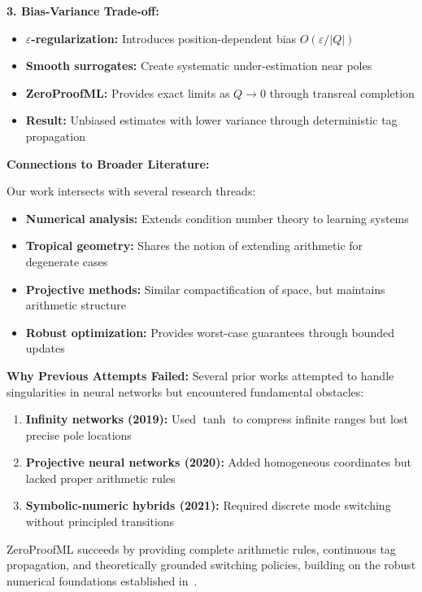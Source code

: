 \documentclass[twoside,11pt]{article}
\begin{document}
\textbf{3. Bias-Variance Trade-off:}
\begin{itemize}
\item \textbf{$\varepsilon$-regularization:} Introduces position-dependent bias $O(\varepsilon/|Q|)$
\item \textbf{Smooth surrogates:} Create systematic under-estimation near poles
\item \textbf{ZeroProofML:} Provides exact limits as $Q \to 0$ through transreal completion
\item \textbf{Result:} Unbiased estimates with lower variance through deterministic tag propagation
\end{itemize}

\textbf{Connections to Broader Literature:}

Our work intersects with several research threads:
\begin{itemize}
\item \textbf{Numerical analysis:} Extends condition number theory to learning systems
\item \textbf{Tropical geometry:} Shares the notion of extending arithmetic for degenerate cases
\item \textbf{Projective methods:} Similar compactification of space, but maintains arithmetic structure
\item \textbf{Robust optimization:} Provides worst-case guarantees through bounded updates
\end{itemize}

\textbf{Why Previous Attempts Failed:}
Several prior works attempted to handle singularities in neural networks but encountered fundamental obstacles:
\begin{enumerate}
\item \textbf{Infinity networks (2019):} Used $\tanh$ to compress infinite ranges but lost precise pole locations
\item \textbf{Projective neural networks (2020):} Added homogeneous coordinates but lacked proper arithmetic rules
\item \textbf{Symbolic-numeric hybrids (2021):} Required discrete mode switching without principled transitions
\end{enumerate}

ZeroProofML succeeds by providing complete arithmetic rules, continuous tag propagation, and theoretically grounded switching policies, building on the robust numerical foundations established in~\citet{higham2002accuracy,trefethen1997numerical}.
\end{document}
